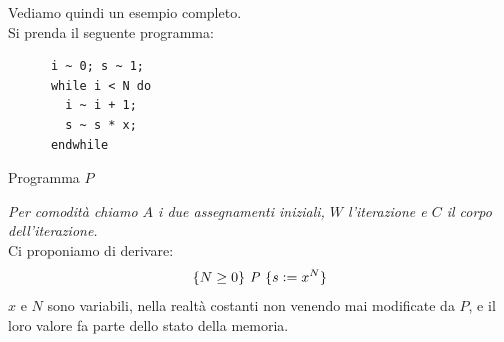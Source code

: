 				      		\begin{esempio}
				      			Vediamo quindi un esempio completo.\\
				      			Si prenda il seguente programma:
				      			\begin{listing}[H]
				      				\begin{lstlisting}
      i ~ 0; s ~ 1;
      while i < N do
        i ~ i + 1;
        s ~ s * x;
      endwhile  
				      				\end{lstlisting}
				      				\caption{Programma $P$}
				      				\label{E:W}
				      			\end{listing}
				      			\textit{Per comodità chiamo $A$ i due assegnamenti iniziali,
				      				$W$ l'iterazione e $C$ il corpo dell'iterazione.}\\
				      			Ci proponiamo di derivare:
				      			\[\{N\geq 0\}\mbox{ \textit{P} }\{s\cceq x^N\}\]
				      			$x$ e $N$ sono variabili, nella realtà costanti non venendo mai modificate da
				      			$P$, e il loro valore fa parte dello stato della memoria.\\
				      							      			  

\end{esempio}
